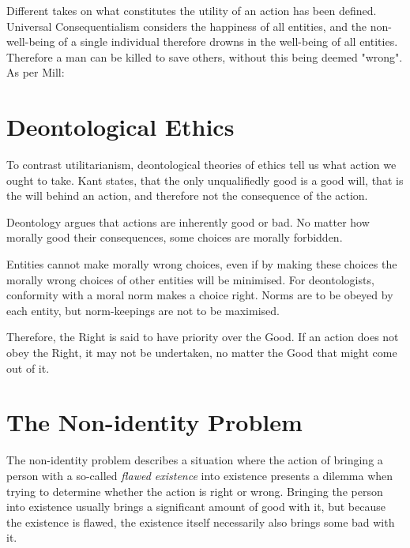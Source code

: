 \newpar Different takes on what constitutes the utility of an action has been defined. \cite{stanford:consequentialism} Universal Consequentialism considers the happiness of all entities, and the non-well-being of a single individual therefore drowns in the well-being of all entities. Therefore a man can be killed to save others, without this being deemed "wrong". As per Mill: 

\begin{quote}
 \cite{holm2013philosophy}	
\end{quote}


\section{Deontological Ethics}
To contrast utilitarianism, deontological theories of ethics tell us what action we ought to take. Kant states, that the only unqualifiedly good is a good will, that is the will behind an action, and therefore not the consequence of the action. \cite{stanford:deontological}

\noindent Deontology argues that actions are inherently good or bad. No matter how morally good their consequences, some choices are morally forbidden. \cite{stanford:deontological}

\newpar Entities cannot make morally wrong choices, even if by making these choices the morally wrong choices of other entities will be minimised. For deontologists, conformity with a moral norm makes a choice right. Norms are to be obeyed by each entity, but norm-keepings are not to be maximised. 

Therefore, the Right is said to have priority over the Good. If an action does not obey the Right, it may not be undertaken, no matter the Good that might come out of it. \cite{stanford:deontological}

\section{The Non-identity Problem}
The non-identity problem describes a situation where the action of bringing a person with a so-called \textit{flawed existence} into existence presents a dilemma when trying to determine whether the action is right or wrong. Bringing the person into existence usually brings a significant amount of good with it, but because the existence is flawed, the existence itself necessarily also brings some bad with it.

